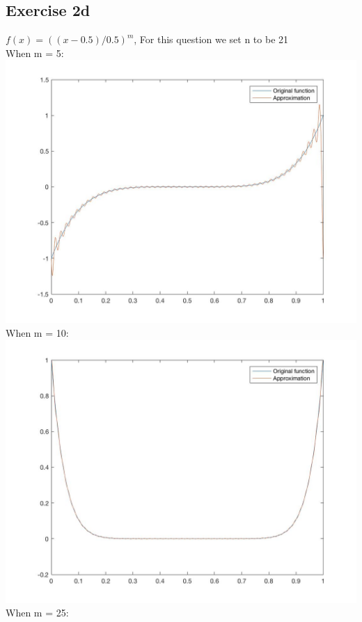 \documentclass[11pt]{article} %
\begin{document}
\subsection{Exercise 2d}
$f(x)=((x-0.5)/0.5)^{m}$, For this question we set n to be 21\\
When m = 5:\\
\includegraphics[scale=0.3]{e241.jpg}\\
When m = 10:\\
\includegraphics[scale=0.3]{e242.jpg}\\
When m = 25:\\
\end{document}
